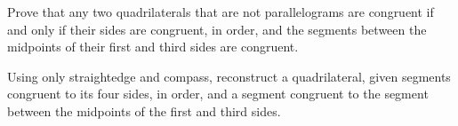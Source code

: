 Prove that any two quadrilaterals that are not parallelograms are congruent if and only if
their sides are congruent, in order,
and the segments between the midpoints of their first and third sides are congruent.

Using only straightedge and compass,
reconstruct a quadrilateral,
given segments congruent to its four sides, in order,
and a segment congruent to the segment between the midpoints of the first and third sides.
